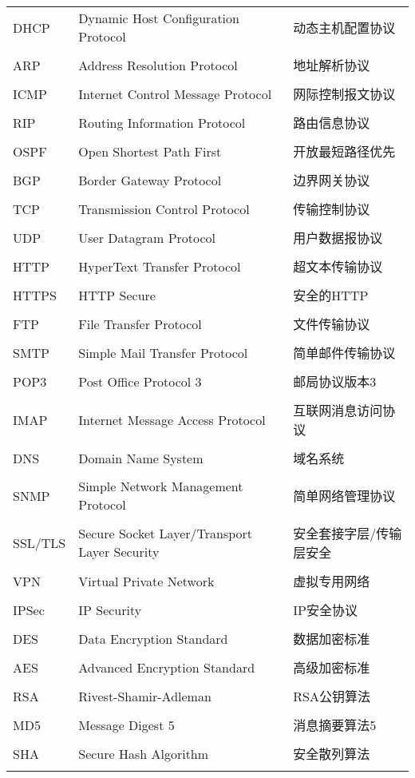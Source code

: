\documentclass[lang=cn,newtx,10pt,scheme=chinese]{../../elegantbook}
\begin{document}
\begin{longtable}{@{}p{4cm}p{4cm}p{6cm}@{}}
DHCP & Dynamic Host Configuration Protocol & 动态主机配置协议 \\\\
ARP & Address Resolution Protocol & 地址解析协议 \\\\
ICMP & Internet Control Message Protocol & 网际控制报文协议 \\\\
RIP & Routing Information Protocol & 路由信息协议 \\\\
OSPF & Open Shortest Path First & 开放最短路径优先 \\\\
BGP & Border Gateway Protocol & 边界网关协议 \\\\
TCP & Transmission Control Protocol & 传输控制协议 \\\\
UDP & User Datagram Protocol & 用户数据报协议 \\\\
HTTP & HyperText Transfer Protocol & 超文本传输协议 \\\\
HTTPS & HTTP Secure & 安全的HTTP \\\\
FTP & File Transfer Protocol & 文件传输协议 \\\\
SMTP & Simple Mail Transfer Protocol & 简单邮件传输协议 \\\\
POP3 & Post Office Protocol 3 & 邮局协议版本3 \\\\
IMAP & Internet Message Access Protocol & 互联网消息访问协议 \\\\
DNS & Domain Name System & 域名系统 \\\\
SNMP & Simple Network Management Protocol & 简单网络管理协议 \\\\
SSL/TLS & Secure Socket Layer/Transport Layer Security & 安全套接字层/传输层安全 \\\\
VPN & Virtual Private Network & 虚拟专用网络 \\\\
IPSec & IP Security & IP安全协议 \\\\
DES & Data Encryption Standard & 数据加密标准 \\\\
AES & Advanced Encryption Standard & 高级加密标准 \\\\
RSA & Rivest-Shamir-Adleman & RSA公钥算法 \\\\
MD5 & Message Digest 5 & 消息摘要算法5 \\\\
SHA & Secure Hash Algorithm & 安全散列算法 \\\\


\end{longtable}
\end{document}
